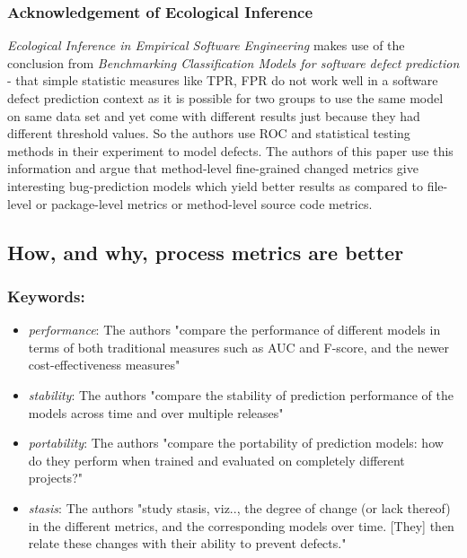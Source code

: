 \documentclass{sig-alternate-05-2015}
\begin{document}
\subsubsection{Acknowledgement of Ecological Inference}
\emph{Ecological Inference in Empirical Software Engineering}  makes use of the conclusion from \emph{Benchmarking Classification Models for software defect prediction}  - that simple statistic measures like TPR, FPR do not work well in a software defect prediction context as it is possible for two groups to use the same model on same data set and yet come with different results just because they had different threshold values. So the authors use ROC and statistical testing methods in their experiment to model defects. The authors of this paper use this information and argue that method-level fine-grained changed metrics give interesting bug-prediction models which yield better results as compared to file-level or package-level metrics or method-level source code metrics.

\subsection{How, and why, process metrics are better \cite{Rahman:2013}}

\subsubsection{Keywords:}
\begin{itemize}
\item \emph{performance}: The authors "compare the performance of different models in terms of both traditional measures such as AUC and F-score, and the newer cost-effectiveness measures"
\item \emph{stability}: The authors "compare the stability of prediction performance of the models across time and over multiple releases"
\item \emph{portability}: The authors "compare the portability of prediction models: how do they perform when trained and evaluated on completely different projects?"
\item \emph{stasis}: The authors "study stasis, viz.., the degree of change (or lack thereof) in the different metrics, and the corresponding models over time. [They] then relate these changes with their ability to prevent defects."
\end{itemize} 
\end{document}
